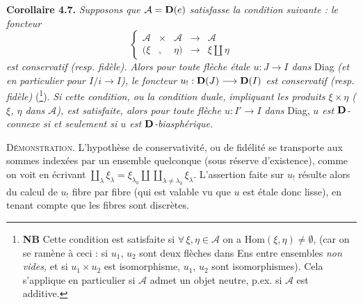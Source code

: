 \textbf{Corollaire 4.7.} \textit{Supposons que $\mathcal{A} = \mathbf{D}(e)$ satisfasse la condition suivante : le foncteur}
\[
\left\{
\begin{array}{lcccl}
\mathcal{A} & \times & \mathcal{A} & \longrightarrow & \mathcal{A} \\[1ex]
(\xi & , & \eta) & \longrightarrow & \xi \amalg \eta
\end{array}
\right.
\]
\textit{est conservatif (resp. fidèle). Alors pour toute flèche étale $u : J \longrightarrow I$ dans} Diag \textit{(et en particulier pour $I/i \longrightarrow I$), le foncteur $u_! : \mathbf{D}(J) \longrightarrow \mathbf{D}(I)$ est conservatif (resp. fidèle)} (\footnote{\textbf{NB} Cette condition est satisfaite si $\forall\, \xi, \eta \in \mathcal{A}$ on a $\mathrm{Hom}(\xi,\eta) \neq \emptyset$, (car on se ramène à ceci : si $u_1$,
$u_2$ sont deux flèches dans Ens entre ensembles \textit{non vides,} et si $u_1 \times u_2$ est isomorphisme, $u_1$, $u_2$ sont isomorphismes). Cela s'applique en particulier si $\mathcal{A}$ admet un objet neutre, p.ex. si $\mathcal{A}$ est additive.}). \textit{Si cette condition, ou la condition duale,}
\textit{impliquant les produits $\xi\times\eta$ ($\xi$, $\eta$ dans $\mathcal{A}$), est satisfaite, alors pour toute flèche $u : I' \longrightarrow I$ dans} Diag, \textit{$u$ est $\mathbf{D}$-connexe si et seulement si $u$ est $\mathbf{D}$-biasphérique.}

\textsc{Démonstration.} L'hypothèse de conservativité, ou de fidélité se transporte aux sommes indexées par un ensemble quelconque (sous réserve d'existence), comme on voit en écrivant $\coprod\limits_{\lambda} \xi_\lambda = \xi_{\lambda_0} \amalg \coprod\limits_{\lambda\neq\lambda_0} \xi_\lambda$. L'assertion faite sur $u_!$ résulte alors du calcul de $u_!$ fibre par fibre (qui est valable vu que $u$ est étale donc lisse), en tenant compte que les fibres sont discrètes.

